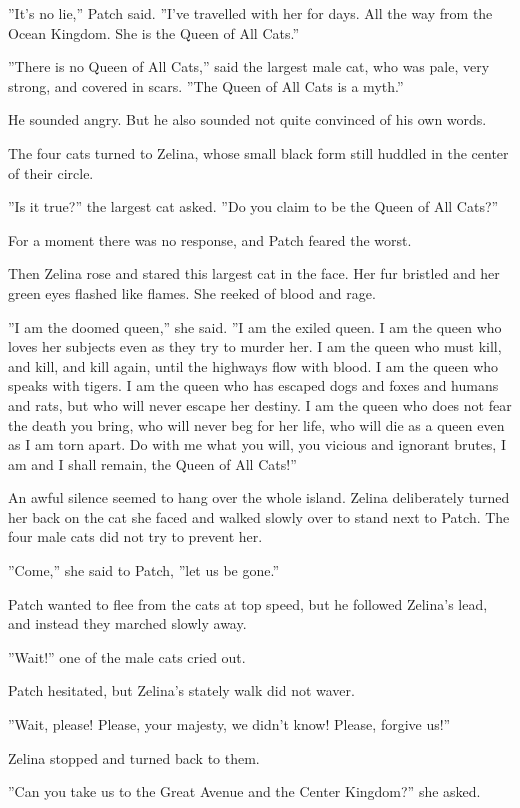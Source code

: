 \documentclass[12pt]{book}
\begin{document}
''It's no lie,'' Patch said. ''I've travelled with her for days. All
the way from the Ocean Kingdom. She is the Queen of All Cats.''

''There is no Queen of All Cats,'' said the largest male cat, who was
pale, very strong, and covered in scars. ''The Queen of All Cats is a
myth.''

He sounded angry. But he also sounded not quite convinced of his own
words.

The four cats turned to Zelina, whose small black form still huddled
in the center of their circle.

''Is it true?'' the largest cat asked. ''Do you claim to be the Queen
of All Cats?''

For a moment there was no response, and Patch feared the worst.

Then Zelina rose and stared this largest cat in the face. Her fur
bristled and her green eyes flashed like flames. She reeked of blood
and rage.

''I am the doomed queen,'' she said. ''I am the exiled queen. I am the
queen who loves her subjects even as they try to murder her. I am the
queen who must kill, and kill, and kill again, until the highways flow
with blood. I am the queen who speaks with tigers. I am the queen who
has escaped dogs and foxes and humans and rats, but who will never
escape her destiny. I am the queen who does not fear the death you
bring, who will never beg for her life, who will die as a queen even
as I am torn apart. Do with me what you will, you vicious and ignorant
brutes, I am and I shall remain, the Queen of All Cats!''

An awful silence seemed to hang over the whole island. Zelina
deliberately turned her back on the cat she faced and walked slowly
over to stand next to Patch. The four male cats did not try to prevent
her.

''Come,'' she said to Patch, ''let us be gone.''

Patch wanted to flee from the cats at top speed, but he followed
Zelina's lead, and instead they marched slowly away.

''Wait!'' one of the male cats cried out.

Patch hesitated, but Zelina's stately walk did not waver.

''Wait, please! Please, your majesty, we didn't know! Please, forgive
us!''

Zelina stopped and turned back to them.

''Can you take us to the Great Avenue and the Center Kingdom?'' she
asked.
\end{document}
